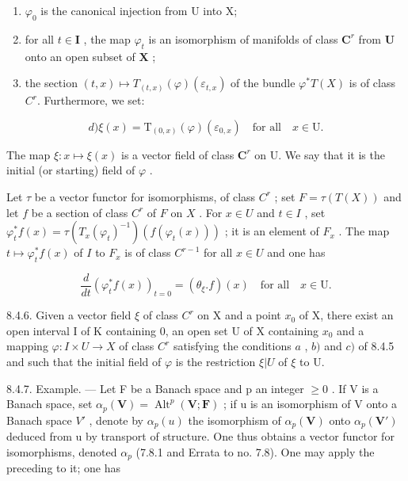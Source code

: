 \begin{enumerate}
\def\labelenumi{\alph{enumi})}
\item
  \(\varphi_{0}\) is the canonical injection from U into X;
\item
  for all \(t \in \mathbf{I}\) , the map \(\varphi_t\) is an isomorphism of manifolds of class \(\mathbf{C}^r\) from \(\mathbf{U}\) onto an open subset of \(\mathbf{X}\) ;
\item
  the section \((t, x) \mapsto T_{(t, x)}(\varphi)(\varepsilon_{t,x})\) of the bundle \(\varphi^*T(X)\) is of class \(C^r\). Furthermore, we set:
\end{enumerate}

\[
d) \xi (x) = \mathrm{T} _ {(0, x)} (\varphi) (\varepsilon_ {0, x}) \quad \text {for all} \quad x \in \mathrm{U}.
\]

The map \(\xi\colon x\mapsto\xi(x)\) is a vector field of class \(\mathbf{C}^{r}\) on U. We say that it is the initial (or starting) field of \(\varphi\) .

Let \(\tau\) be a vector functor for isomorphisms, of class \(C^r\) ; set \(F = \tau(T(X))\) and let \(f\) be a section of class \(C^r\) of \(F\) on \(X\) . For \(x \in U\) and \(t \in I\) , set \(\varphi_t^* f(x) = \tau(T_x(\varphi_t)^{-1})(f(\varphi_t(x)))\) ; it is an element of \(F_x\) . The map \(t \mapsto \varphi_t^* f(x)\) of \(I\) to \(F_x\) is of class \(C^{r-1}\) for all \(x \in U\) and one has

\[
\frac {d}{d t} \left(\varphi_ {t} ^ {*} f (x)\right) _ {t = 0} = \left(\theta_ {\xi}. f\right) (x) \quad \text {for all} \quad x \in \mathrm{U}.\tag{2}
\]

8.4.6. Given a vector field \(\xi\) of class \(C^r\) on X and a point \(x_0\) of X, there exist an open interval I of K containing 0, an open set U of X containing \(x_0\) and a mapping \(\varphi: I \times U \to X\) of class \(C^r\) satisfying the conditions \(a\) , \(b)\) and \(c)\) of 8.4.5 and such that the initial field of \(\varphi\) is the restriction \(\xi|U\) of \(\xi\) to U.

8.4.7. Example. --- Let F be a Banach space and p an integer \(\geqslant0\) . If V is a Banach space, set \(\alpha_{p}(\mathbf{V}) = \operatorname{Alt}^{p}(\mathbf{V}; \mathbf{F})\) ; if u is an isomorphism of V onto a Banach space \(V'\) , denote by \(\alpha_{p}(u)\) the isomorphism of \(\alpha_{p}(\mathbf{V})\) onto \(\alpha_{p}(\mathbf{V}')\) deduced from u by transport of structure. One thus obtains a vector functor for isomorphisms, denoted \(\alpha_{p}\) (7.8.1 and Errata to no. 7.8). One may apply the preceding to it; one has

